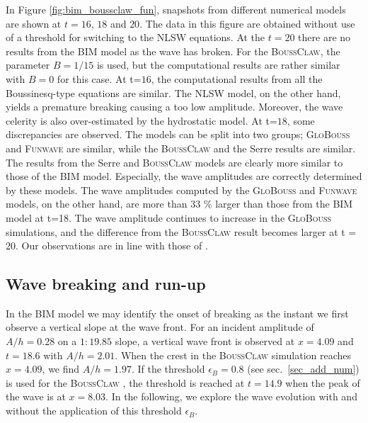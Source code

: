 \documentclass[review]{elsarticle}
\newcommand{\BoussClaw}{\textsc{BoussClaw} }
\newcommand{\BoussClawt}{\textsc{BoussClaw}}
\begin{document}
In Figure \ref{fig:bim_boussclaw_fun}, snapshots from different
numerical models are shown at $t=16$, $18$ and $20$. The data in this figure are obtained without
use of a threshold for switching to the NLSW equations.
At the $t=20$ there are no results from the BIM model as  the wave has broken.
For the \BoussClawt, the parameter $B=1/15$ is used, 
but the computational results are rather similar with $B=0$
for this case. 
At t=$16$, the computational results
from all the Boussinesq-type equations are similar.
The NLSW model, on the other hand, yields a premature breaking 
causing a too low amplitude. Moreover, the wave celerity is also over-estimated
by the hydrostatic model. 
At t=$18$, some discrepancies are observed. The models  
can be split into two groups; 
\textsc{GloBouss} and \textsc{Funwave} 
are similar, while the \BoussClaw
and the Serre results are similar. 
The results from the Serre and \BoussClaw models are clearly
more similar to those of the BIM model. 
Especially, the wave amplitudes are correctly determined by these models.
The wave amplitudes computed by the \textsc{GloBouss} and \textsc{Funwave} models, on the other hand,
are more than 33 \% 
larger than those from the BIM model at t=18.
The wave amplitude continues to increase in the
\textsc{GloBouss} simulations,
and the difference from the \BoussClaw result 
becomes larger at t = $20$. 
Our observations are in line with those of \citet{wei1995fully}.
 
\subsection{Wave breaking and run-up}
\label{sec:discuss_breaking}
In the BIM model we may identify the onset of breaking as the instant we first observe a vertical slope at the wave front.
For an incident amplitude of $A/h=0.28$ on a $1:19.85$ slope,
a vertical wave front is observed at $x=4.09$ and $t=18.6$ with $A/h=2.01$.
When the crest in the \BoussClaw simulation reaches $x=4.09$, 
we find $A/h=1.97$.
If the threshold $\epsilon_B=0.8$ (see sec.~\ref{sec_add_num})
is used for the \BoussClaw,
the threshold is  reached at $t=14.9$
when the peak of the wave is at $x=8.03$.
In the following, we explore the wave evolution with and without
the application of this threshold $\epsilon_B$.
\end{document}
